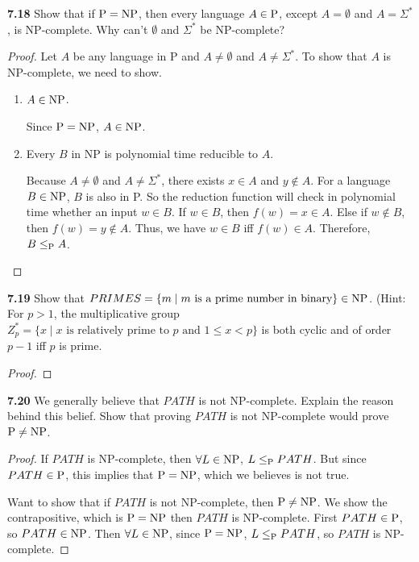 \textbf{7.18} Show that if $\P = \NP$, then every language $A \in \P$, except $A = \emptyset$ and $A = \Sigma^*$, is
NP-complete. Why can’t $\emptyset$ and $\Sigma^*$ be NP-complete?
\begin{mdframed}
\begin{proof}
Let $A$ be any language in P and $A \neq \emptyset$ and $A \neq \Sigma^*$. To show that $A$ is NP-complete, we need to show.
\begin{enumerate}
\item $A \in \NP$.

Since $\P = \NP$, $A \in \NP$.
\item Every $B$ in NP is polynomial time reducible to $A$.

Because $A \neq \emptyset$ and $A \neq \Sigma^*$, there exists $x \in A$ and $y \not \in A$. For a language $B \in \NP$, $B$ is also in P. So the reduction function will check in polynomial time whether an input $w\in B$. If $w \in B$, then $f(w) = x \in A$. Else if $w \not \in B$, then $f(w) = y \not \in A$. Thus, we have $w \in B$ iff $f(w) \in A$. Therefore, $B \leq_\P A$.
\end{enumerate}
\end{proof}
\end{mdframed}

\textbf{7.19} Show that $PRIMES = \{ m \mid m \text{ is a prime number in binary}\} \in \NP$. (Hint: For $p > 1$, the multiplicative group $Z_p^* = \{ x \mid x \text{ is relatively prime to $p$ and $1\leq x < p$}\}$ is both cyclic and of order $p-1$ iff $p$ is prime. 

\begin{mdframed}
\begin{proof}

\end{proof}
\end{mdframed}

\textbf{7.20} We generally believe that $PATH$ is not NP-complete. Explain the reason behind this belief. Show that proving $PATH$ is not NP-complete would prove $\P \neq \NP$.
\begin{mdframed}
\begin{proof}
If $PATH$ is NP-complete, then $\forall L \in \NP$, $L \leq_\P PATH$. But since $PATH \in \P$, this implies that $\P = \NP$, which we believes is not true.

\medskip
Want to show that if $PATH$ is not NP-complete, then $\P \neq \NP$. We show the contrapositive, which is $\P = \NP$ then $PATH$ is NP-complete. First $PATH \in \P$, so $PATH \in \NP$. Then $\forall L \in \NP$, since $\P = \NP$, $L \leq_\P PATH$, so $PATH$ is NP-complete.
\end{proof}
\end{mdframed}

